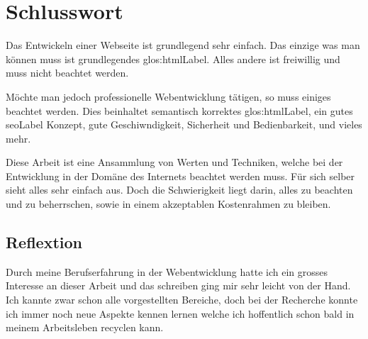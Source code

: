 \chapter{Schlusswort}
Das Entwickeln einer Webseite ist grundlegend sehr einfach. Das einzige was man können muss ist grundlegendes \Gls{glos:htmlLabel}. Alles andere ist freiwillig und muss nicht beachtet werden.

Möchte man jedoch professionelle Webentwicklung tätigen, so muss einiges beachtet werden. Dies beinhaltet semantisch korrektes \Gls{glos:htmlLabel}, ein gutes \gls{seoLabel} Konzept, gute Geschiwndigkeit, Sicherheit und Bedienbarkeit, und vieles mehr. 

Diese Arbeit ist eine Ansammlung von Werten und Techniken, welche bei der Entwicklung in der Domäne des Internets beachtet werden muss. Für sich selber sieht alles sehr einfach aus. Doch die Schwierigkeit liegt darin, alles zu beachten und zu beherrschen, sowie in einem akzeptablen Kostenrahmen zu bleiben.

\section{Reflextion}
Durch meine Berufserfahrung in der Webentwicklung hatte ich ein grosses Interesse an dieser Arbeit und das schreiben ging mir sehr leicht von der Hand. Ich kannte zwar schon alle vorgestellten Bereiche, doch bei der Recherche konnte ich immer noch neue Aspekte kennen lernen welche ich hoffentlich schon bald in meinem Arbeitsleben recyclen kann.


\glsaddall
